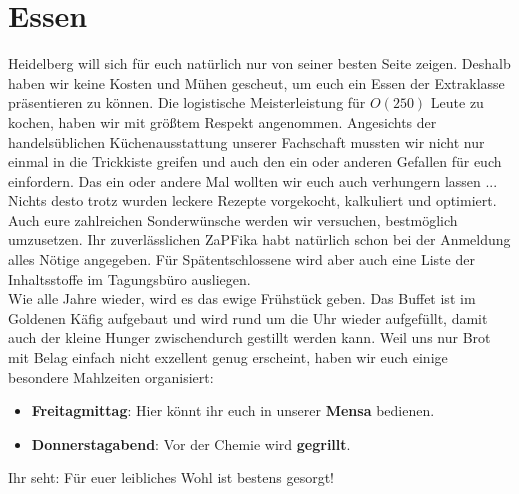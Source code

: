 \section{Essen}
  Heidelberg will sich für euch natürlich nur von seiner besten Seite zeigen. Deshalb haben wir keine Kosten und Mühen gescheut,
  um euch ein Essen der Extraklasse präsentieren zu können.
  Die logistische Meisterleistung für $O(250)$ Leute zu kochen, haben wir mit größtem Respekt angenommen.
  Angesichts der handelsüblichen Küchenausstattung unserer Fachschaft mussten wir nicht nur einmal in
  die Trickkiste greifen und auch den ein oder anderen Gefallen für euch einfordern. Das ein oder andere Mal wollten
  wir euch auch verhungern lassen ... \\
  Nichts desto trotz wurden leckere Rezepte vorgekocht, kalkuliert und optimiert.
  Auch eure zahlreichen Sonderwünsche werden wir versuchen, bestmöglich umzusetzen.
  Ihr zuverlässlichen ZaPFika habt natürlich schon bei der Anmeldung alles Nötige angegeben.
  Für Spätentschlossene wird aber auch eine Liste der Inhaltsstoffe im Tagungsbüro ausliegen. \\

  Wie alle Jahre wieder, wird es das ewige Frühstück geben. Das Buffet ist im Goldenen
  Käfig aufgebaut und wird rund um die Uhr wieder aufgefüllt, damit auch der kleine
  Hunger zwischendurch gestillt werden kann.
  Weil uns nur Brot mit Belag einfach nicht exzellent genug erscheint, haben wir euch einige besondere Mahlzeiten organisiert:
  \begin{itemize}
    \item \textbf{Freitagmittag}: Hier könnt ihr euch in unserer \textbf{Mensa} bedienen.
    \item \textbf{Donnerstagabend}: Vor der Chemie wird \textbf{gegrillt}.
  \end{itemize}
  Ihr seht: Für euer leibliches Wohl ist bestens gesorgt!

